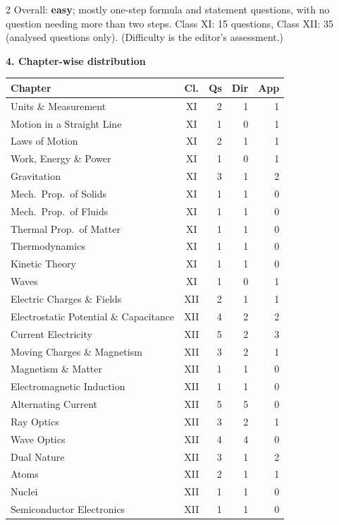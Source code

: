 \begin{multicols}{2}
{\footnotesize Overall: \textbf{easy}; mostly one-step formula and statement questions, with no question needing more than two steps. Class XI: 15 questions, Class XII: 35 (analysed questions only). (Difficulty is the editor's assessment.)}\par\medskip
\columnbreak
\textbf{\color{crimson}4. Chapter-wise distribution}\par\smallskip
{\footnotesize\begin{tabular}{@{}p{4.7cm}c@{\,}r@{\,}r@{\,}r@{}}\toprule
Chapter & Cl. & Qs & Dir & App\\\midrule
Units \& Measurement & XI & 2 & 1 & 1\\
Motion in a Straight Line & XI & 1 & 0 & 1\\
Laws of Motion & XI & 2 & 1 & 1\\
Work, Energy \& Power & XI & 1 & 0 & 1\\
Gravitation & XI & 3 & 1 & 2\\
Mech.\ Prop.\ of Solids & XI & 1 & 1 & 0\\
Mech.\ Prop.\ of Fluids & XI & 1 & 1 & 0\\
Thermal Prop.\ of Matter & XI & 1 & 1 & 0\\
Thermodynamics & XI & 1 & 1 & 0\\
Kinetic Theory & XI & 1 & 1 & 0\\
Waves & XI & 1 & 0 & 1\\
Electric Charges \& Fields & XII & 2 & 1 & 1\\
Electrostatic Potential \& Capacitance & XII & 4 & 2 & 2\\
Current Electricity & XII & 5 & 2 & 3\\
Moving Charges \& Magnetism & XII & 3 & 2 & 1\\
Magnetism \& Matter & XII & 1 & 1 & 0\\
Electromagnetic Induction & XII & 1 & 1 & 0\\
Alternating Current & XII & 5 & 5 & 0\\
Ray Optics & XII & 3 & 2 & 1\\
Wave Optics & XII & 4 & 4 & 0\\
Dual Nature & XII & 3 & 1 & 2\\
Atoms & XII & 2 & 1 & 1\\
Nuclei & XII & 1 & 1 & 0\\
Semiconductor Electronics & XII & 1 & 1 & 0\\
\bottomrule\end{tabular}}\par\medskip

\end{multicols}
